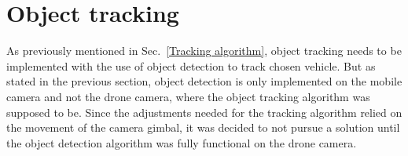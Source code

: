 \section{Object tracking} \label{sec:object_track}
As previously mentioned in Sec.~\ref{Tracking algorithm}, object tracking needs to be implemented with the use of object detection to track chosen vehicle. But as stated in the previous section, object detection is only implemented on the mobile camera and not the drone camera, where the object tracking algorithm was supposed to be. Since the adjustments needed for the tracking algorithm relied on the movement of the camera gimbal, it was decided to not pursue a solution until the object detection algorithm was fully functional on the drone camera.
 

